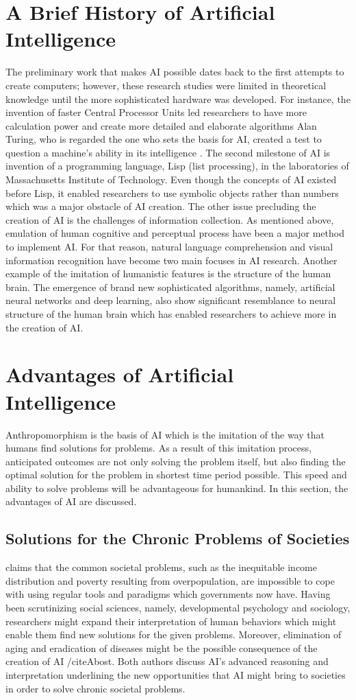 \documentclass[man]{apa6}
\begin{document}
\section{A Brief History of Artificial Intelligence}
The preliminary work that makes AI possible dates back to the first attempts to create computers; however, these research studies were limited in theoretical knowledge until the more
sophisticated hardware was developed. For instance, the invention of faster Central Processor Units led researchers to have more calculation power and create more detailed and elaborate algorithms \cite{bost} Alan Turing, who is regarded the one who sets the basis for AI, created a test to question a machine's ability in its intelligence \cite{gre}. The second milestone of AI is invention of a programming language, Lisp (list processing), in the laboratories of Massachusetts Institute of Technology. Even though the concepts of AI existed before Lisp, it enabled researchers to use symbolic objects rather than numbers which was a major obstacle of AI creation. The other issue precluding the creation of AI is the challenges of information collection. As mentioned above, emulation of human cognitive and perceptual process have been a major method to implement AI. For that reason, natural language comprehension and visual information recognition have become two main focuses in AI research. Another example of the imitation of humanistic features is the structure of the human brain. The emergence of brand new sophisticated algorithms, namely, artificial neural networks and deep learning, also show significant resemblance to neural structure of the human brain which has
enabled researchers to achieve more in the creation of AI. 
\section{Advantages of Artificial Intelligence}
Anthropomorphism is the basis of AI which is the imitation of the way that humans find solutions for problems. As a result of this imitation process, anticipated outcomes are not only solving the problem itself, but also finding the optimal solution for the problem in shortest time period possible. This speed and ability to solve problems will be advantageous for humankind. In this section, the advantages of AI are discussed. 
\subsection{Solutions for the Chronic Problems of Societies}
 claims that the common societal problems, such as the inequitable income distribution and poverty resulting from overpopulation, are impossible to cope with using regular tools and paradigms which governments now have. Having been scrutinizing social sciences, namely, developmental psychology and sociology, researchers might expand their interpretation of human behaviors which might enable them find new solutions for the given problems. Moreover, elimination of aging and eradication of diseases might be the possible consequence of the creation of AI /citeA{bost}. Both authors discuss AI's advanced reasoning and interpretation underlining the new opportunities that AI might bring to societies in order to solve chronic societal problems.
\end{document}

